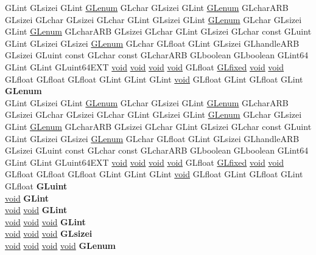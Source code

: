 \begin{DoxyCompactItemize}
\begin{tabbing}
\>GLint GLsizei GLint \hyperlink{interfacevoid}{GLenum} GLchar GLsizei GLint \hyperlink{interfacevoid}{GLenum} GLcharARB GLsizei GLchar GLsizei GLchar GLint GLsizei GLint \hyperlink{interfacevoid}{GLenum} GLchar GLsizei GLint \hyperlink{interfacevoid}{GLenum} GLcharARB GLsizei GLchar GLint GLsizei GLchar const GLuint GLint GLsizei GLsizei \hyperlink{interfacevoid}{GLenum} GLchar GLfloat GLint GLsizei GLhandleARB GLsizei GLuint const GLchar const GLcharARB GLboolean GLboolean GLint64 GLint GLint GLuint64EXT \hyperlink{interfacevoid}{void} \hyperlink{interfacevoid}{void} \hyperlink{interfacevoid}{void} \hyperlink{interfacevoid}{void} GLfloat \hyperlink{glheader_8h_ad6d3fa892df40dedf48ee6d84529ae5e}{GLfixed} \hyperlink{interfacevoid}{void} \hyperlink{interfacevoid}{void} GLfloat GLfloat GLfloat GLint GLint GLint \hyperlink{interfacevoid}{void} GLfloat GLint GLfloat GLint {\bfseries GLenum}\\
\>GLint GLsizei GLint \hyperlink{interfacevoid}{GLenum} GLchar GLsizei GLint \hyperlink{interfacevoid}{GLenum} GLcharARB GLsizei GLchar GLsizei GLchar GLint GLsizei GLint \hyperlink{interfacevoid}{GLenum} GLchar GLsizei GLint \hyperlink{interfacevoid}{GLenum} GLcharARB GLsizei GLchar GLint GLsizei GLchar const GLuint GLint GLsizei GLsizei \hyperlink{interfacevoid}{GLenum} GLchar GLfloat GLint GLsizei GLhandleARB GLsizei GLuint const GLchar const GLcharARB GLboolean GLboolean GLint64 GLint GLint GLuint64EXT \hyperlink{interfacevoid}{void} \hyperlink{interfacevoid}{void} \hyperlink{interfacevoid}{void} \hyperlink{interfacevoid}{void} GLfloat \hyperlink{glheader_8h_ad6d3fa892df40dedf48ee6d84529ae5e}{GLfixed} \hyperlink{interfacevoid}{void} \hyperlink{interfacevoid}{void} GLfloat GLfloat GLfloat GLint GLint GLint \hyperlink{interfacevoid}{void} GLfloat GLint GLfloat GLint GLfloat {\bfseries GLuint}\\
\>\hyperlink{interfacevoid}{void} {\bfseries GLint}\\
\>\hyperlink{interfacevoid}{void} \hyperlink{interfacevoid}{void} {\bfseries GLint}\\
\>\hyperlink{interfacevoid}{void} \hyperlink{interfacevoid}{void} \hyperlink{interfacevoid}{void} {\bfseries GLint}\\
\>\hyperlink{interfacevoid}{void} \hyperlink{interfacevoid}{void} \hyperlink{interfacevoid}{void} {\bfseries GLsizei}\\
\>\hyperlink{interfacevoid}{void} \hyperlink{interfacevoid}{void} \hyperlink{interfacevoid}{void} \hyperlink{interfacevoid}{void} {\bfseries GLenum}\\

\end{tabbing}
\end{DoxyCompactItemize}
